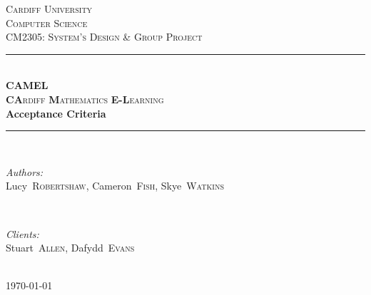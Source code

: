\documentclass[12pt]{article}
\begin{document}
	\begin{titlepage}
		\newcommand{\HRule}{\rule{\linewidth}{0.5mm}}

		\center

		\textsc{\LARGE Cardiff University}\\[1.5cm]
		\textsc{\Large Computer Science}\\[0.5cm]
		\textsc{\large CM2305: System's Design \& Group Project}\\[0.5cm]

		\HRule \\[0.4cm]
		\textsc{\Large \textbf{CAMEL}}\\[0.1cm]
		\textsc{\Large \textbf{CA}rdiff \textbf{M}athematics \textbf{E-L}earning}\\[0.7cm]
		{\huge\bfseries Acceptance Criteria}\\[0.4cm]
		\HRule \\[1.5cm]

		\begin{minipage}{0.4\textwidth}
			\begin{flushleft} \large
				\emph{Authors:}\\
				\mbox{Lucy \textsc{Robertshaw}}, \mbox{Cameron \textsc{Fish}}, \mbox{Skye \textsc{Watkins}}
			\end{flushleft}
		\end{minipage}
		~
		\begin{minipage}{0.4\textwidth}
			\begin{flushright} \large
				\emph{Clients:} \\
				\mbox{Stuart \textsc{Allen}}, \mbox{Dafydd \textsc{Evans}}
			\end{flushright}
		\end{minipage}\\[3cm]

		{\large \today}\\[2cm]

		\vfill
	\end{titlepage}


	\tableofcontents

	\newpage
\end{document}
